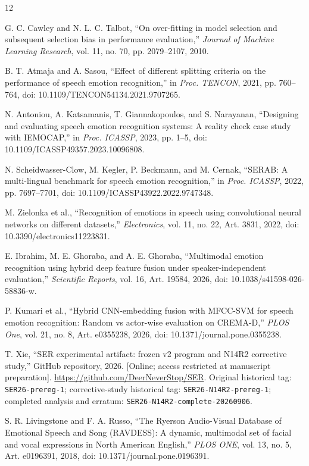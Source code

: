 \documentclass[letterpaper]{article}
\begin{document}
\clearpage
\begin{thebibliography}{12}
\raggedright
{} G. C. Cawley and N. L. C. Talbot, ``On over-fitting in model selection and subsequent selection bias in performance evaluation,'' \emph{Journal of Machine Learning Research}, vol. 11, no. 70, pp. 2079--2107, 2010.

 B. T. Atmaja and A. Sasou, ``Effect of different splitting criteria on the performance of speech emotion recognition,'' in \emph{Proc. TENCON}, 2021, pp. 760--764, doi: 10.1109/TENCON54134.2021.9707265.

 N. Antoniou, A. Katsamanis, T. Giannakopoulos, and S. Narayanan, ``Designing and evaluating speech emotion recognition systems: A reality check case study with IEMOCAP,'' in \emph{Proc. ICASSP}, 2023, pp. 1--5, doi: 10.1109/ICASSP49357.2023.10096808.

 N. Scheidwasser-Clow, M. Kegler, P. Beckmann, and M. Cernak, ``SERAB: A multi-lingual benchmark for speech emotion recognition,'' in \emph{Proc. ICASSP}, 2022, pp. 7697--7701, doi: 10.1109/ICASSP43922.2022.9747348.

 M. Zielonka et al., ``Recognition of emotions in speech using convolutional neural networks on different datasets,'' \emph{Electronics}, vol. 11, no. 22, Art. 3831, 2022, doi: 10.3390/electronics11223831.

 E. Ibrahim, M. E. Ghoraba, and A. E. Ghoraba, ``Multimodal emotion recognition using hybrid deep feature fusion under speaker-independent evaluation,'' \emph{Scientific Reports}, vol. 16, Art. 19584, 2026, doi: 10.1038/s41598-026-58836-w.

 P. Kumari et al., ``Hybrid CNN-embedding fusion with MFCC-SVM for speech emotion recognition: Random vs actor-wise evaluation on CREMA-D,'' \emph{PLOS One}, vol. 21, no. 8, Art. e0355238, 2026, doi: 10.1371/journal.pone.0355238.

 T. Xie, ``SER experimental artifact: frozen v2 program and N14R2 corrective study,'' GitHub repository, 2026. [Online; access restricted at manuscript preparation]. \url{https://github.com/DeerNeverStop/SER}. Original historical tag: \texttt{SER26-prereg-1}; corrective-study historical tag: \texttt{SER26-N14R2-prereg-1}; completed analysis and erratum: \texttt{SER26-N14R2-complete-20260906}.

 S. R. Livingstone and F. A. Russo, ``The Ryerson Audio-Visual Database of Emotional Speech and Song (RAVDESS): A dynamic, multimodal set of facial and vocal expressions in North American English,'' \emph{PLOS ONE}, vol. 13, no. 5, Art. e0196391, 2018, doi: 10.1371/journal.pone.0196391.


\end{thebibliography}
\end{document}
